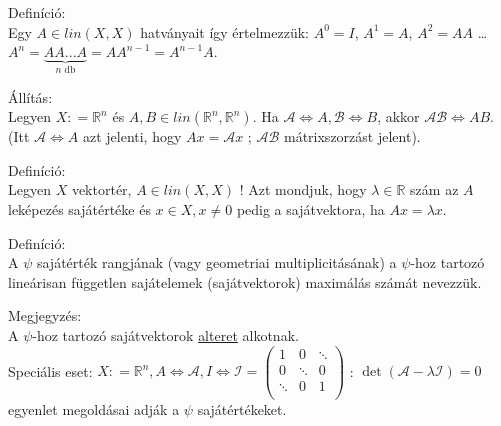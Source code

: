 \documentclass[12pt,a4paper]{scrartcl}
\newenvironment{definicio}{}{}
\newenvironment{allitas}{}{}
\newenvironment{megjegyzes}{}{}
\begin{document}
\begin{definicio}

Definíció:\\
Egy \(A \in {lin}\left( {X,X} \right)\) hatványait így értelmezzük:
\(A^{0} = I\), \(A^{1} = A\), \(A^{2} = AA\) \ldots{}
\({A^n} = \underbrace {AA...A}_{n{\text{ db}}} = A{A^{n - 1}} = {A^{n - 1}}A\).

\end{definicio}

\begin{allitas}

Állítás:\\
Legyen \(X: = {\mathbb{R}}^{n}\) és
\(A,B \in {lin}\left( {{\mathbb{R}}^{n},{\mathbb{R}}^{n}} \right)\). Ha
\(\left. \mathcal{A}\Leftrightarrow A,\mathcal{B}\Leftrightarrow B \right.\),
akkor \(\left. \mathcal{A}\mathcal{B}\Leftrightarrow AB \right.\). (Itt
\(\left. \mathcal{A}\Leftrightarrow A \right.\) azt jelenti, hogy
\(Ax = \mathcal{A}x\) ; \(\mathcal{A}\mathcal{B}\) mátrixszorzást
jelent).

\end{allitas}

\begin{definicio}

Definíció:\\
Legyen \(X\) vektortér, \(A \in {lin}\left( {X,X} \right)\) ! Azt
mondjuk, hogy \(\lambda \in {\mathbb{R}}\) szám az \(A\) leképezés
sajátértéke és \(x \in X,x \neq 0\) pedig a sajátvektora, ha
\(Ax = \lambda x\).

\end{definicio}

\begin{definicio}

Definíció:\\
A \(\psi\) sajátérték rangjának (vagy geometriai multiplicitásának) a
\(\psi\)-hoz tartozó lineárisan független sajátelemek (sajátvektorok)
maximálás számát nevezzük.

\end{definicio}

\begin{megjegyzes}

Megjegyzés:\\
A \(\psi\)-hoz tartozó sajátvektorok
\href{http://hu.wikipedia.org/wiki/Altér}{alteret} alkotnak.\\
Speciális eset:
\(\left. X: = {\mathbb{R}}^{n},A\Leftrightarrow\mathcal{A},I\Leftrightarrow\mathcal{I} = \left( \begin{array}{lll} 1 & 0 & \ddots \\ 0 & \ddots & 0 \\  \ddots & 0 & 1 \\ \end{array} \right) \right.\)
: \(\det\left( {\mathcal{A} - \lambda\mathcal{I}} \right) = 0\) egyenlet
megoldásai adják a \(\psi\) sajátértékeket.

\end{megjegyzes}
\end{document}
